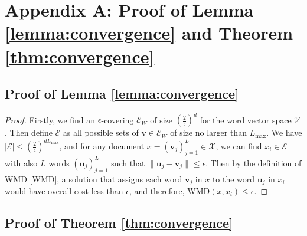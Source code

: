 \documentclass[11pt,a4paper]{article}
\newcommand{\X}{\mathcal{X}}
\newcommand{\V}{\mathcal{V}}
\newcommand{\1}{\boldsymbol{1}}
\newcommand{\bv}{\boldsymbol{v}}
\newcommand{\bu}{\boldsymbol{u}}
\newcommand{\WMD}{\text{WMD}}
\newcommand{\E}{\mathcal{E}}
\begin{document}
%


%



\clearpage
\appendix
\section{Appendix A: Proof of Lemma \ref{lemma:convergence} and Theorem \ref{thm:convergence}}
\label{App:Appendix A: Proof of Lemma and Theorem}

\subsection{Proof of Lemma \ref{lemma:convergence}}
\label{App:Proof of Lemma 1}

\begin{proof}
Firstly, we find an $\epsilon$-covering $\E_W$ of size $(\frac{2}{\epsilon})^{d}$ for the word vector space $\V$ . Then define $\E$ as all possible sets of $\bv\in\E_W$ of size no larger than $L_{\max}$. We have $|\E|\leq (\frac{2}{\epsilon})^{dL_{\max}}$, and for any document $x=(\bv_j)_{j=1}^L \in\X$, we can find $x_i\in \E$ with also $L$ words $(\bu_j)_{j=1}^L$ such that $\|\bu_j-\bv_j\|\leq \epsilon$. Then by the definition of WMD \eqref{WMD}, a solution that assigns each word $\bv_j$ in $x$ to the word $\bu_j$ in $x_i$ would have overall cost less than $\epsilon$, and therefore, $\WMD(x,x_i)\leq \epsilon$.
\end{proof}

\subsection{Proof of Theorem \ref{thm:convergence}}
\label{App:Proof of Theorem 1}
\end{document}
